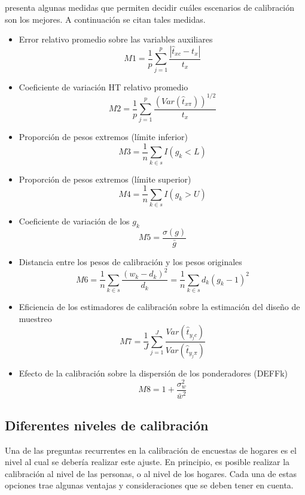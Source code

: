 \documentclass[
  10pt,
  spanish,
]{book}
\begin{document}
\citet{Silva_2004} presenta algunas medidas que permiten decidir cuáles escenarios de calibración son los mejores. A continuación se citan tales medidas.

\begin{itemize}
\item
  Error relativo promedio sobre las variables auxiliares
  \[
  M1= \frac{1}{p} \sum_{j=1}^p \frac{|\hat{t}_{xc} - t_x|}{t_x}
  \]
\item
  Coeficiente de variación HT relativo promedio
  \[M2= \frac{1}{p} \sum_{j=1}^p \frac{(Var(\hat{t}_{x\pi}))^{1/2}}{t_x} \]
\item
  Proporción de pesos extremos (límite inferior)
  \[M3 = \frac{1}{n} \sum_{k \in s}I(g_k<L)\]
\item
  Proporción de pesos extremos (límite superior)
  \[M4= \frac{1}{n} \sum_{k \in s}I(g_k>U)\]
\item
  Coeficiente de variación de los \(g_k\)
  \[M5= \frac{\sigma(g)}{\bar{g}}\]
\item
  Distancia entre los pesos de calibración y los pesos originales
  \[M6 = \frac{1}{n}\sum_{k \in s} \frac{(w_k - d_k)^2}{d_k}
  = \frac{1}{n}\sum_{k \in s} d_k(g_k - 1)^2\]
\item
  Eficiencia de los estimadores de calibración sobre la estimación del diseño de muestreo
  \[M7 = \frac{1}{J}\sum_{j=1}^J \frac{Var(\hat{t}_{y_jc})}{Var(\hat{t}_{y_j\pi})} \]
\item
  Efecto de la calibración sobre la dispersión de los ponderadores (DEFFk)
  \[M8 = 1+\frac{\sigma^2_w}{\bar{w}^2}\]
\end{itemize}

\hypertarget{diferentes-niveles-de-calibraciuxf3n}{%
\subsection{Diferentes niveles de calibración}\label{diferentes-niveles-de-calibraciuxf3n}}

Una de las preguntas recurrentes en la calibración de encuestas de hogares es el nivel al cual se debería realizar este ajuste. En principio, es posible realizar la calibración al nivel de las personas, o al nivel de los hogares. Cada una de estas opciones trae algunas ventajas y consideraciones que se deben tener en cuenta.
\end{document}
